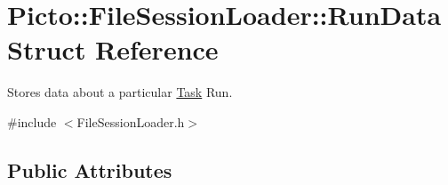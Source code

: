 \hypertarget{struct_picto_1_1_file_session_loader_1_1_run_data}{\section{Picto\-:\-:File\-Session\-Loader\-:\-:Run\-Data Struct Reference}
\label{struct_picto_1_1_file_session_loader_1_1_run_data}
}


Stores data about a particular \hyperlink{class_picto_1_1_task}{Task} Run.  




{\ttfamily \#include $<$File\-Session\-Loader.\-h$>$}

\subsection*{Public Attributes}
